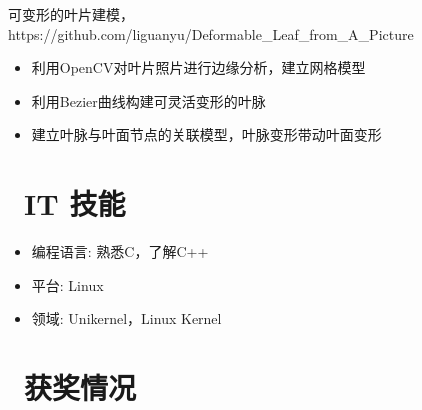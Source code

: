 \documentclass{resume}
\begin{document}
可变形的叶片建模，https://github.com/liguanyu/Deformable\_Leaf\_from\_A\_Picture
\begin{itemize}
  \item 利用OpenCV对叶片照片进行边缘分析，建立网格模型
  \item 利用Bezier曲线构建可灵活变形的叶脉
  \item 建立叶脉与叶面节点的关联模型，叶脉变形带动叶面变形
\end{itemize}


\vspace{1.5ex}
\section{\faCogs\  IT 技能}
\begin{itemize}[parsep=0.5ex]
  \item 编程语言: 熟悉C，了解C++
  \item 平台: Linux
  \item 领域: Unikernel，Linux Kernel
\end{itemize}

\section{\faCheckSquare\  获奖情况}


%
%
\end{document}
